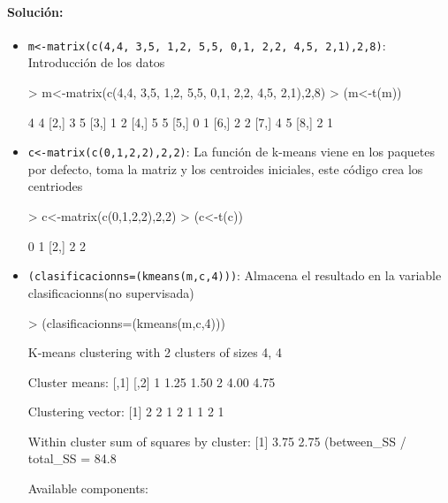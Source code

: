 \documentclass[a4paper, 12pt]{article}
\begin{document}
	\paragraph{Solución:}
	\begin{itemize}
		\item \texttt{m<-matrix(c(4,4, 3,5, 1,2, 5,5, 0,1, 2,2, 4,5, 2,1),2,8)}: 
		Introducción de los datos
\begin{Schunk}
\begin{Sinput}
> m<-matrix(c(4,4, 3,5, 1,2, 5,5, 0,1, 2,2, 4,5, 2,1),2,8)
> (m<-t(m))
\end{Sinput}
\begin{Soutput}
     [,1] [,2]
[1,]    4    4
[2,]    3    5
[3,]    1    2
[4,]    5    5
[5,]    0    1
[6,]    2    2
[7,]    4    5
[8,]    2    1
\end{Soutput}
\end{Schunk}
		\item \texttt{c<-matrix(c(0,1,2,2),2,2)}: 
		La función de k-means viene en los paquetes por defecto, toma la matriz y los centroides iniciales, este código crea los centriodes
\begin{Schunk}
\begin{Sinput}
> c<-matrix(c(0,1,2,2),2,2)
> (c<-t(c))
\end{Sinput}
\begin{Soutput}
     [,1] [,2]
[1,]    0    1
[2,]    2    2
\end{Soutput}
\end{Schunk}
		\item \texttt{(clasificacionns=(kmeans(m,c,4)))}: 
		Almacena el resultado en la variable clasificacionns(no supervisada)
\begin{Schunk}
\begin{Sinput}
> (clasificacionns=(kmeans(m,c,4)))
\end{Sinput}
\begin{Soutput}
K-means clustering with 2 clusters of sizes 4, 4

Cluster means:
  [,1] [,2]
1 1.25 1.50
2 4.00 4.75

Clustering vector:
[1] 2 2 1 2 1 1 2 1

Within cluster sum of squares by cluster:
[1] 3.75 2.75
 (between_SS / total_SS =  84.8 %

Available components:


\end{Soutput}
\end{Schunk}
\end{itemize}
\end{document}
